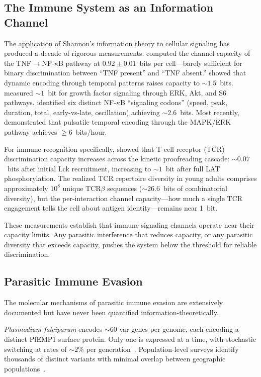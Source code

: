 \documentclass[twocolumn,10pt]{article}
\begin{document}
\subsection{The Immune System as an Information Channel}

The application of Shannon's information theory to cellular signaling has produced a decade of rigorous measurements.  \citet{cheong2011} computed the channel capacity of the TNF$\to$NF-$\kappa$B pathway at $0.92 \pm 0.01$~bits per cell---barely sufficient for binary discrimination between ``TNF present'' and ``TNF absent.''  \citet{selimkhanov2014} showed that dynamic encoding through temporal patterns raises capacity to ${\sim}1.5$~bits.  \citet{uda2013} measured ${\sim}1$~bit for growth factor signaling through ERK, Akt, and S6 pathways.  \citet{adelaja2021} identified six distinct NF-$\kappa$B ``signaling codons'' (speed, peak, duration, total, early-vs-late, oscillation) achieving ${\sim}2.6$~bits.  Most recently, \citet{nalecz2023} demonstrated that pulsatile temporal encoding through the MAPK/ERK pathway achieves $\geq 6$~bits/hour.

For immune recognition specifically, \citet{ganti2020} showed that T-cell receptor (TCR) discrimination capacity increases across the kinetic proofreading cascade: ${\sim}0.07$~bits after initial Lck recruitment, increasing to ${\sim}1$~bit after full LAT phosphorylation.  The realized TCR repertoire diversity in young adults comprises approximately $10^8$ unique TCR$\beta$ sequences (${\sim}26.6$~bits of combinatorial diversity), but the per-interaction channel capacity---how much a single TCR engagement tells the cell about antigen identity---remains near 1~bit.

These measurements establish that immune signaling channels operate near their capacity limits.  Any parasitic interference that reduces capacity, or any parasitic diversity that exceeds capacity, pushes the system below the threshold for reliable discrimination.

\subsection{Parasitic Immune Evasion}

The molecular mechanisms of parasitic immune evasion are extensively documented but have never been quantified information-theoretically.

\textit{Plasmodium falciparum} encodes ${\sim}60$ var genes per genome, each encoding a distinct PfEMP1 surface protein.  Only one is expressed at a time, with stochastic switching at rates of ${\sim}2\%$ per generation~\citep{horrocks2004}.  Population-level surveys identify thousands of distinct variants with minimal overlap between geographic populations~\citep{barry2007,day2017,otto2019}.
\end{document}
